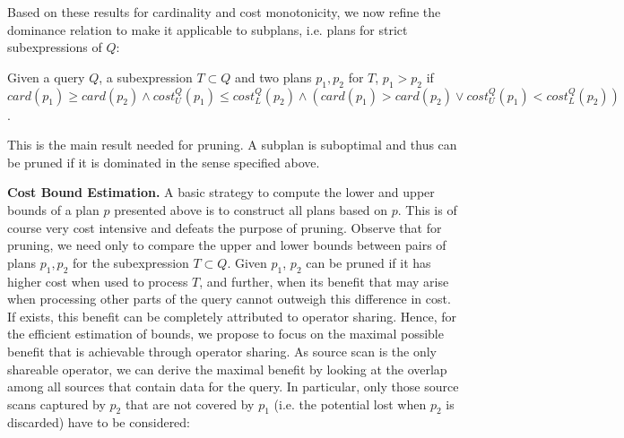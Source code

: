 Based on these results for cardinality and cost monotonicity, we now
refine the dominance relation to make it applicable to subplans,
i.e. plans for strict subexpressions of $Q$:

\begin{theorem}
  \label{def:dominates_bound}
  Given a query $Q$, a subexpression $T \subset Q$ and two plans
  $p_1,p_2$ for $T$, $p_1 > p_2$ if
  $card(p_1) \geq card(p_2) \wedge cost_U^Q(p_1) \leq cost_L^Q(p_2)
  \wedge (card(p_1) > card(p_2) \vee cost_U^Q(p_1) < cost_L^Q(p_2))$.
\end{theorem}

This is the main result needed for pruning. A subplan is suboptimal
and thus can be pruned if it is dominated in the sense specified
above.



\textbf{Cost Bound Estimation.} 
A basic strategy to compute the lower and upper
bounds of a plan $p$ presented above is to construct all plans based on
$p$. This is of course very cost intensive and defeats the purpose of pruning. Observe that for pruning, we need only to compare the upper and lower bounds between pairs of plans $p_1,p_2$ for the subexpression $T \subset Q$. Given $p_1$, $p_2$ can be pruned if it has higher cost when used to process $T$, and further, when its benefit that may arise when processing other parts of the query cannot outweigh this difference in cost. If exists, this benefit can be completely attributed to operator sharing. Hence, for the efficient estimation of bounds, we propose to focus on the maximal possible benefit that is achievable through operator sharing. As source scan is the only shareable operator, we can derive the maximal benefit by looking at the overlap among all sources that contain data for the query. In particular, only those source scans captured by $p_2$ that are not covered by $p_1$ (i.e. the potential lost when $p_2$ is discarded) have to be considered: 

